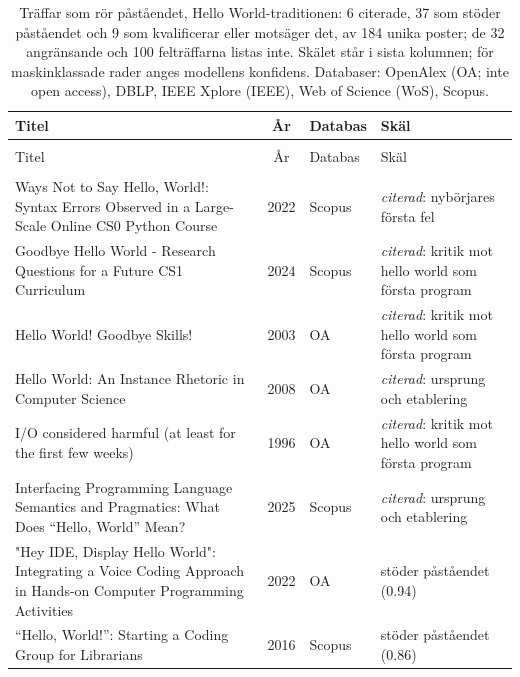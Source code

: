 \begingroup\footnotesize
\begin{longtable}{@{}%
  >{\raggedright\arraybackslash}p{}c%
  >{\raggedright\arraybackslash}p{}%
  >{\raggedright\arraybackslash}p{}@{}}
\caption{Träffar som rör påståendet, Hello World-traditionen: 6 citerade, 37 som stöder påståendet och 9 som kvalificerar eller motsäger det, av 184 unika poster; de 32 angränsande och 100 felträffarna listas inte.  Skälet står i sista kolumnen; för maskinklassade rader anges modellens konfidens.  Databaser: OpenAlex (OA; inte \foreignlanguage{english}{open access}), DBLP, IEEE Xplore (IEEE), Web of Science (WoS), Scopus.}\label{tab:sok-hello-world}\\
\toprule
Titel & År & Databas & Skäl \\
\midrule
\endfirsthead
\multicolumn{4}{@{}l}{\emph{\tablename~\thetable{} (\GetTranslation{continued})}}\\
\toprule Titel & År & Databas & Skäl \\ \midrule
\endhead
\midrule \multicolumn{4}{r@{}}{\emph{\GetTranslation{continued on the next page}}}\\
\endfoot
\bottomrule
\endlastfoot
115 Ways Not to Say Hello, World!: Syntax Errors Observed in a Large-Scale Online CS0 Python Course & 2022 & Scopus & \emph{citerad}: nybörjares första fel \\
Goodbye Hello World - Research Questions for a Future CS1 Curriculum & 2024 & Scopus & \emph{citerad}: kritik mot hello world som första program \\
Hello World! Goodbye Skills! & 2003 & OA & \emph{citerad}: kritik mot hello world som första program \\
Hello World: An Instance Rhetoric in Computer Science & 2008 & OA & \emph{citerad}: ursprung och etablering \\
I/O considered harmful (at least for the first few weeks) & 1996 & OA & \emph{citerad}: kritik mot hello world som första program \\
Interfacing Programming Language Semantics and Pragmatics: What Does ``Hello, World'' Mean? & 2025 & Scopus & \emph{citerad}: ursprung och etablering \\
"Hey IDE, Display Hello World": Integrating a Voice Coding Approach in Hands-on Computer Programming Activities & 2022 & OA & stöder påståendet (0.94) \\
``Hello, World!'': Starting a Coding Group for Librarians & 2016 & Scopus & stöder påståendet (0.86) \\

\end{longtable}
